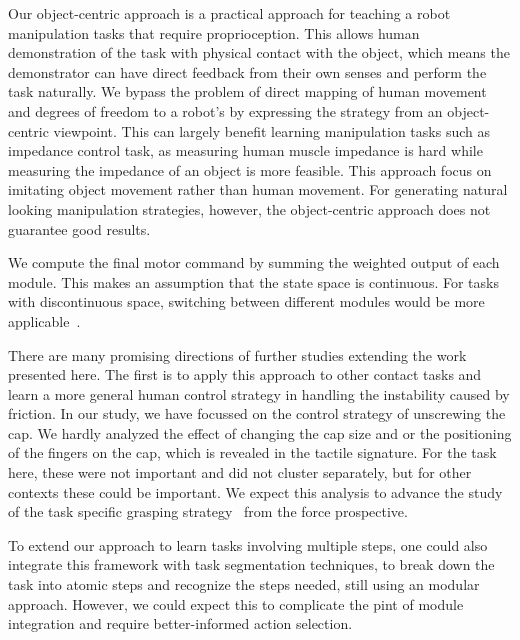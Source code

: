 Our object-centric approach is a practical approach for teaching a
robot manipulation tasks that require proprioception. This allows
human demonstration of the task with physical contact with the object,
which means the demonstrator can have direct feedback from their own
senses and perform the task naturally. We bypass the problem of direct
mapping of human movement and degrees of freedom to a robot's by
expressing the strategy from an object-centric viewpoint. This can
largely benefit learning manipulation tasks such as impedance control
task, as measuring human muscle impedance is hard while measuring the
impedance of an object is more feasible. This approach focus on imitating object movement rather than human movement. For generating natural looking manipulation strategies, however, the object-centric approach does not guarantee good results.

We compute the final motor command by summing the weighted output of
each module. This makes an assumption that the state space is
continuous. For tasks with discontinuous space, switching between different modules would be more applicable~\cite{narendra1995adaptation,nakanishi2013spatio}.


There are many promising directions of further studies extending the
work presented here. The first is to apply this approach to other
contact tasks and learn a more general human control strategy in
handling the instability caused by friction.
In our study, we have focussed on the control strategy of unscrewing
the cap. We hardly analyzed the effect of changing the cap size and or
the positioning of the fingers on the cap, which is revealed in the
tactile signature. For the task here, these were not important and
did not cluster separately, but for other contexts these could be
important. We expect this analysis to advance the study of the task specific grasping
strategy~\citep{el2013generation,dang2014semantic} from the force prospective.

To extend our approach to learn tasks involving multiple steps, one
could also integrate this framework with task segmentation techniques,
to break down the task into atomic steps and recognize the steps
needed, still using an modular approach. However, we could expect this
to complicate the pint of module integration and require
better-informed action selection. %

